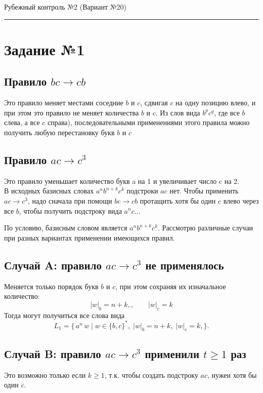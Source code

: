\documentclass[12pt,a4paper]{article}
\begin{document}
{\Large\bfseries
\begin{flushleft}
Рубежный контроль №2 (Вариант №20)
\end{flushleft}}
\vspace{0.5em}\hrule\vspace{1.2em}

\section*{Задание №1}
\subsection*{Правило $bc\to cb$}
Это правило меняет местами соседние $b$ и $c$, сдвигая $c$ на одну позицию влево, и при этом это правило не меняет количества $b$ и $c$. Из слов вида $b^p c^q$, где все $b$ слева, а все $c$ справа), последовательными применениями этого правила можно получить любую перестановку букв $b$ и $c$

\subsection*{Правило $ac\to c^3$}
Это правило уменьшает количество букв a на 1 и увеличивает число c на 2.\\
В исходных базисных словах $a^n b^{n+k} c^k$ подстроки $ac$ нет. Чтобы применить $ac\to c^3$, надо сначала при помощи $bc\to cb$ протащить хотя бы один $c$ влево через все $b$, чтобы получить подстроку вида $a^n c\ldots$

По условию, базисным словом является $a^n b^{n+k}c^k$. Рассмотрю различные случаи при разных вариантах применении имеющихся правил.

\subsection*{Случай A: правило $ac\to c^3$ не применялось}
Меняется только порядок букв $b$ и $c$, при этом сохраняя их изначальное количество:
\[
|w|_b=n+k,,\qquad |w|_c=k
\]
Тогда могут получиться все слова вида
\[
L_1=\{\,a^n\,w \mid w\in\{b,c\}^*,\; |w|_b=n+k,\;|w|_c=k,\}.
\]

\subsection*{Случай B: правило $ac\to c^3$ применили $t\ge 1$ раз}
Это возможно только если $k\ge 1$, т.к. чтобы создать подстроку $ac$, нужен хотя бы один $c$.
\end{document}
